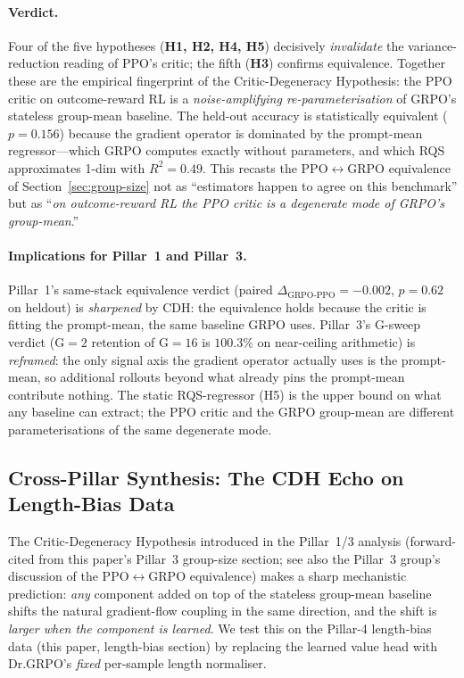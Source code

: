 \documentclass{article}
\begin{document}
\paragraph{Verdict.}
Four of the five hypotheses (\textbf{H1, H2, H4, H5}) decisively
\emph{invalidate} the variance-reduction reading of PPO's critic; the
fifth (\textbf{H3}) confirms equivalence. Together these are the
empirical fingerprint of the Critic-Degeneracy Hypothesis: the PPO
critic on outcome-reward RL is a \emph{noise-amplifying re-parameterisation}
of GRPO's stateless group-mean baseline. The held-out accuracy is
statistically equivalent ($p{=}0.156$) because the gradient operator
is dominated by the prompt-mean regressor---which GRPO computes
exactly without parameters, and which RQS approximates 1-dim with
$R^2{=}0.49$. This recasts the PPO$\leftrightarrow$GRPO equivalence
of Section~\ref{sec:group-size} not as ``estimators happen to agree
on this benchmark'' but as ``\emph{on outcome-reward RL the PPO
critic is a degenerate mode of GRPO's group-mean}.''

\paragraph{Implications for Pillar~1 and Pillar~3.}
Pillar~1's same-stack equivalence verdict (paired
$\Delta_{\text{GRPO-PPO}} = -0.002$, $p{=}0.62$ on heldout) is
\emph{sharpened} by CDH: the equivalence holds because the critic
is fitting the prompt-mean, the same baseline GRPO uses. Pillar~3's
G-sweep verdict (G${=}2$ retention of G${=}16$ is $100.3\%$ on
near-ceiling arithmetic) is \emph{reframed}: the only signal axis
the gradient operator actually uses is the prompt-mean, so
additional rollouts beyond what already pins the prompt-mean
contribute nothing. The static RQS-regressor (H5) is the upper bound
on what any baseline can extract; the PPO critic and the GRPO
group-mean are different parameterisations of the same degenerate
mode. 

\subsection{Cross-Pillar Synthesis: The CDH Echo on Length-Bias Data}
\label{sec:cdh-echo}

The Critic-Degeneracy Hypothesis introduced in the Pillar~1/3
analysis (forward-cited from this paper's Pillar~3 group-size
section; see also the Pillar~3 group's discussion of the
PPO$\leftrightarrow$GRPO equivalence) makes a sharp mechanistic
prediction: \emph{any} component added on top of the stateless
group-mean baseline shifts the natural gradient-flow coupling in
the same direction, and the shift is \emph{larger when the
component is learned}. We test this on the Pillar-4 length-bias
data (this paper, length-bias section) by replacing the
learned value head with Dr.GRPO's \emph{fixed} per-sample length
normaliser.
\end{document}
